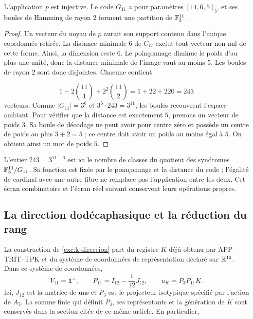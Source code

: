 \begin{proposition}
\label{iv:prop:codigo-once}
L’application \(p\) est injective. Le code \(G_{11}\) a pour
paramètres \([11,6,5]_3\), et ses boules de Hamming de rayon
\(2\) forment une partition de \(\mathbb F_3^{11}\).
\end{proposition}
\begin{proof}
Un vecteur du noyau de \(p\) aurait son support contenu dans
l’unique coordonnée retirée. La distance minimale \(6\)
de \(C_W\) exclut tout vecteur non nul de cette forme.
Ainsi, la dimension reste \(6\). Le poinçonnage diminue
le poids d’au plus une unité, donc la distance minimale
de l’image vaut au moins \(5\). Les boules de rayon \(2\)
sont donc disjointes. Chacune contient

\[
 1+2\binom{11}{1}+2^2\binom{11}{2}
 =1+22+220=243
\]
vecteurs. Comme \(|G_{11}|=3^6\) et
\(3^6\cdot243=3^{11}\), les boules recouvrent l’espace ambiant.
Pour vérifier que la distance est exactement \(5\),
prenons un vecteur de poids \(3\). Sa boule de décodage
ne peut avoir pour centre zéro et possède un centre de poids au
plus \(3+2=5\) ; ce centre doit avoir un poids au moins égal à
\(5\). On obtient ainsi un mot de poids \(5\).
\end{proof}

L’entier \(243=3^{11-6}\) est ici le nombre de classes
du quotient des syndromes \(\mathbb F_3^{11}/G_{11}\). Sa
fonction est fixée par le poinçonnage et la distance du
code ; l’égalité de cardinal avec une autre fibre ne remplace pas
l’application entre les deux. Cet écran combinatoire et
l’écran réel suivant conservent leurs opérations propres.

\subsection{La direction dodécaphasique et la réduction du rang}

La construction de \ref{exc:k-direccion} part du registre
\(K\) déjà obtenu par APP--TRIT--TPK et du système de coordonnées de
représentation déclaré sur \(\mathbb R^{12}\). Dans ce système de coordonnées,
\begin{equation}
 V_{11}=\mathbf1^\perp,\qquad
 P_{11}=I_{12}-\frac1{12}J_{12},\qquad
 u_K=P_3P_{11}K.
 \label{iv:eq:p11-uk}
\end{equation}
Ici, \(J_{12}\) est la matrice de uns et \(P_3\) est le
projecteur isotypique spécifié par l’action de \(A_5\).
La somme finie qui définit \(P_3\), ses représentants et la
génération de \(K\) sont conservés dans la section citée de
ce même article. En particulier,

